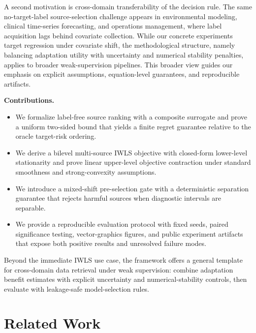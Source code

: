 \documentclass{article} %
\begin{document}
A second motivation is cross-domain transferability of the decision rule. The same no-target-label source-selection challenge appears in environmental modeling, clinical time-series forecasting, and operations management, where label acquisition lags behind covariate collection. While our concrete experiments target regression under covariate shift, the methodological structure, namely balancing adaptation utility with uncertainty and numerical stability penalties, applies to broader weak-supervision pipelines. This broader view guides our emphasis on explicit assumptions, equation-level guarantees, and reproducible artifacts.

\textbf{Contributions.}
\begin{itemize}
\item We formalize label-free source ranking with a composite surrogate and prove a uniform two-sided bound that yields a finite regret guarantee relative to the oracle target-risk ordering.
\item We derive a bilevel multi-source IWLS objective with closed-form lower-level stationarity and prove linear upper-level objective contraction under standard smoothness and strong-convexity assumptions.
\item We introduce a mixed-shift pre-selection gate with a deterministic separation guarantee that rejects harmful sources when diagnostic intervals are separable.
\item We provide a reproducible evaluation protocol with fixed seeds, paired significance testing, vector-graphics figures, and public experiment artifacts that expose both positive results and unresolved failure modes.
\end{itemize}

Beyond the immediate IWLS use case, the framework offers a general template for cross-domain data retrieval under weak supervision: combine adaptation benefit estimates with explicit uncertainty and numerical-stability controls, then evaluate with leakage-safe model-selection rules.

\section{Related Work}
\end{document}
